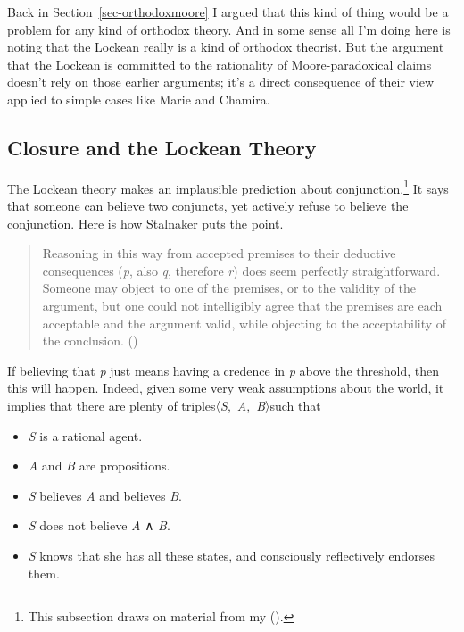 \documentclass[
  12pt,
  letterpaper,
]{scrbook}
\providecommand{\tightlist}{%
  \setlength{\itemsep}{0pt}\setlength{\parskip}{0pt}}\usepackage{longtable,booktabs,array}
\begin{document}
Back in Section~\ref{sec-orthodoxmoore} I argued that this kind of thing
would be a problem for any kind of orthodox theory. And in some sense
all I'm doing here is noting that the Lockean really is a kind of
orthodox theorist. But the argument that the Lockean is committed to the
rationality of Moore-paradoxical claims doesn't rely on those earlier
arguments; it's a direct consequence of their view applied to simple
cases like Marie and Chamira.

\subsection{Closure and the Lockean Theory}\label{sec-closure}

The Lockean theory makes an implausible prediction about
conjunction.\footnote{This subsection draws on material from my
  ().} It says that someone can
believe two conjuncts, yet actively refuse to believe the conjunction.
Here is how Stalnaker puts the point.

\begin{quote}
Reasoning in this way from accepted premises to their deductive
consequences (\emph{p}, also \emph{q}, therefore \emph{r}) does seem
perfectly straightforward. Someone may object to one of the premises, or
to the validity of the argument, but one could not intelligibly agree
that the premises are each acceptable and the argument valid, while
objecting to the acceptability of the conclusion.
()
\end{quote}

If believing that \emph{p} just means having a credence in \emph{p}
above the threshold, then this will happen. Indeed, given some very weak
assumptions about the world, it implies that there are plenty of
triples〈\emph{S},~\emph{A},~\emph{B}〉such that

\begin{itemize}
\tightlist
\item
  \emph{S} is a rational agent.
\item
  \emph{A} and \emph{B} are propositions.
\item
  \emph{S} believes \emph{A} and believes \emph{B}.
\item
  \emph{S} does not believe \emph{A} ∧ \emph{B}.
\item
  \emph{S} knows that she has all these states, and consciously
  reflectively endorses them.
\end{itemize}
\end{document}
